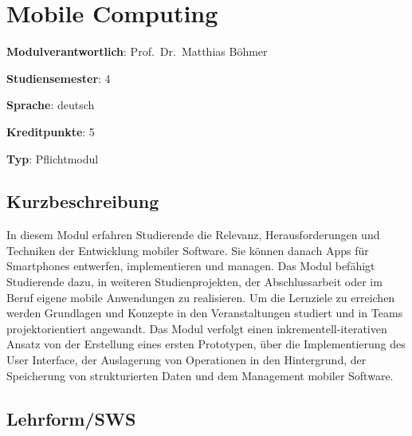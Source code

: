 \hypertarget{mobile-computingpathlabelmi-2017modulbeschreibungen-bachelorba_mobile-computing}{%
\chapter{Mobile
Computing\label{/mi-2017/modulbeschreibungen-bachelor/BA_Mobile-Computing}}\label{mobile-computingpathlabelmi-2017modulbeschreibungen-bachelorba_mobile-computing}}

\begin{modulHead}
\textbf{Modulverantwortlich}: Prof.~Dr.~Matthias
Böhmer
\end{modulHead}
\begin{modulHead}
\textbf{Studiensemester}:
4
\end{modulHead}
\begin{modulHead}
\textbf{Sprache}:
deutsch
\end{modulHead}
\begin{modulHead}
\textbf{Kreditpunkte}:
5
\end{modulHead}
\begin{modulHead}
\textbf{Typ}:
Pflichtmodul
\end{modulHead}


\hypertarget{kurzbeschreibungpathlabelmi-2017modulbeschreibungen-bachelorba_mobile-computing}{%
\section*{Kurzbeschreibung\label{/mi-2017/modulbeschreibungen-bachelor/BA_Mobile-Computing}}\label{kurzbeschreibungpathlabelmi-2017modulbeschreibungen-bachelorba_mobile-computing}}

In diesem Modul erfahren Studierende die Relevanz, Herausforderungen und
Techniken der Entwicklung mobiler Software. Sie können danach Apps für
Smartphones entwerfen, implementieren und managen. Das Modul befähigt
Studierende dazu, in weiteren Studienprojekten, der Abschlussarbeit oder
im Beruf eigene mobile Anwendungen zu realisieren. Um die Lernziele zu
erreichen werden Grundlagen und Konzepte in den Veranstaltungen studiert
und in Teams projektorientiert angewandt. Das Modul verfolgt einen
inkrementell-iterativen Ansatz von der Erstellung eines ersten
Prototypen, über die Implementierung des User Interface, der Auslagerung
von Operationen in den Hintergrund, der Speicherung von strukturierten
Daten und dem Management mobiler Software.

\hypertarget{lehrformswspathlabelmi-2017modulbeschreibungen-bachelorba_mobile-computing}{%
\section*{Lehrform/SWS\label{/mi-2017/modulbeschreibungen-bachelor/BA_Mobile-Computing}}\label{lehrformswspathlabelmi-2017modulbeschreibungen-bachelorba_mobile-computing}}

